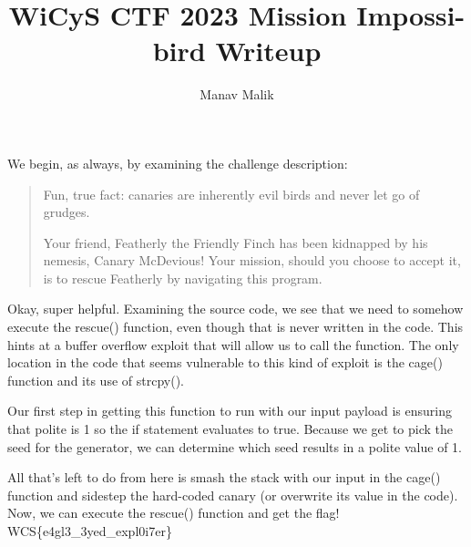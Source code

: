 \documentclass{article}
\title{WiCyS CTF 2023 Mission Impossi-bird Writeup}
\author{Manav Malik}
\date{}
\begin{document}
\maketitle

We begin, as always, by examining the challenge description:

\begin{quote}
    Fun, true fact: canaries are inherently evil birds and never let go of grudges.
    
    Your friend, Featherly the Friendly Finch has been kidnapped by his nemesis, Canary McDevious! Your mission, should you choose to accept it, is to rescue Featherly by navigating this program.
\end{quote}
Okay, super helpful. Examining the source code, we see that we need to somehow execute the {\sf rescue()} function, even though that is never written in the code. This hints at a buffer overflow exploit that will allow us to call the function. The only location in the code that seems vulnerable to this kind of exploit is the {\sf cage()} function and its use of {\sf strcpy()}.

Our first step in getting this function to run with our input payload is ensuring that {\sf polite} is 1 so the {\sf if} statement evaluates to {\sf true}. Because we get to pick the seed for the generator, we can determine which seed results in a {\sf polite} value of 1.

All that's left to do from here is smash the stack with our input in the {\sf cage()} function and sidestep the hard-coded canary (or overwrite its value in the code). Now, we can execute the {\sf rescue()} function and get the flag! {\sf WCS\{e4gl3\_3yed\_expl0i7er\}}
\end{document}
